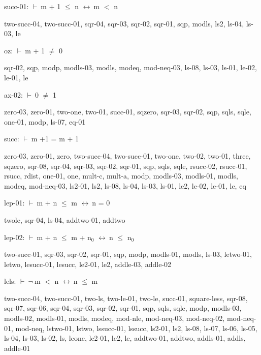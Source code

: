 \documentclass[a4paper]{article}
\newcommand{\Fol}{\mbox{$\vdash\ $}}
\newcommand{\Not}{\mbox{$\neg\ $}}
\newcommand{\Equiv}{\mbox{$\leftrightarrow\ $}}
\begin{document}
\bigskip

succ-01: 
 \Fol m + 1 $\le$ n \Equiv m $<$ n



two-succ-04, two-succ-01, sqr-04, sqr-03, sqr-02, sqr-01, sqp, modls, ls2, ls-04, ls-03, le

\bigskip

oz: 
 \Fol m + 1 $\neq$ 0



sqr-02, sqp, modp, modls-03, modls, modeq, mod-neq-03, ls-08, ls-03, ls-01, le-02, le-01, le

\bigskip

ax-02: 
 \Fol 0 $\neq$ 1



zero-03, zero-01, two-one, two-01, succ-01, sqzero, sqr-03, sqr-02, sqp, sqls, sqle, one-01, modp, ls-07, eq-01

\bigskip

succ: 
 \Fol m +1 = m + 1



zero-03, zero-01, zero, two-succ-04, two-succ-01, two-one, two-02, two-01, three, sqzero, sqr-08, sqr-04, sqr-03, sqr-02, sqr-01, sqp, sqls, sqle, rsucc-02, rsucc-01, rsucc, rdist, one-01, one, mult-c, mult-a, modp, modls-03, modls-01, modls, modeq, mod-neq-03, ls2-01, ls2, ls-08, ls-04, ls-03, ls-01, le2, le-02, le-01, le, eq

\bigskip

lep-01: 
 \Fol m + n $\le$ m \Equiv n = 0



twole, sqr-04, ls-04, addtwo-01, addtwo

\bigskip

lep-02: 
 \Fol m + n $\le$ m + $\mbox{n}_{0}$ \Equiv n $\le$ $\mbox{n}_{0}$



two-succ-01, sqr-03, sqr-02, sqr-01, sqp, modp, modls-01, modls, ls-03, letwo-01, letwo, lesucc-01, lesucc, le2-01, le2, addle-03, addle-02

\bigskip

lels: 
 \Fol \Not m $<$ n \Equiv n $\le$ m



two-succ-04, two-succ-01, two-ls, two-le-01, two-le, succ-01, square-less, sqr-08, sqr-07, sqr-06, sqr-04, sqr-03, sqr-02, sqr-01, sqp, sqls, sqle, modp, modls-03, modls-02, modls-01, modls, modeq, mod-nle, mod-neq-03, mod-neq-02, mod-neq-01, mod-neq, lstwo-01, lstwo, lssucc-01, lssucc, ls2-01, ls2, ls-08, ls-07, ls-06, ls-05, ls-04, ls-03, ls-02, ls, leone, le2-01, le2, le, addtwo-01, addtwo, addls-01, addls, addle-01
\end{document}
